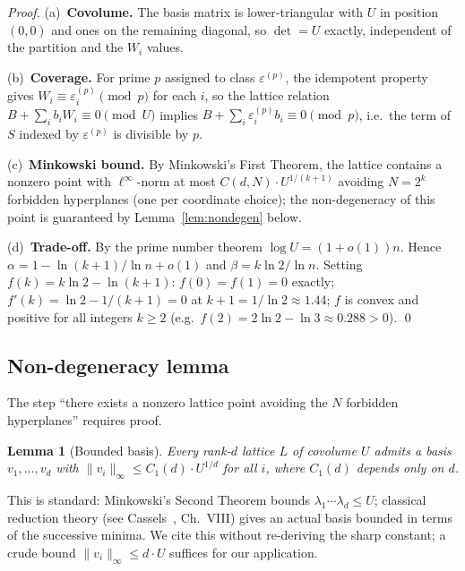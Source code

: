 \documentclass[12pt]{article}
\newtheorem{lemma}[theorem]{Lemma}
\theoremstyle{remark}
\newcommand{\norm}[1]{\lVert #1 \rVert}
\begin{document}
\begin{proof}
(a)~\textbf{Covolume.}  The basis matrix is lower-triangular with $U$ in
position $(0,0)$ and ones on the remaining diagonal, so $\det = U$ exactly,
independent of the partition and the $W_i$ values.

(b)~\textbf{Coverage.}  For prime $p$ assigned to class $\varepsilon^{(p)}$, the
idempotent property gives $W_i \equiv \varepsilon_i^{(p)} \pmod{p}$ for each
$i$, so the lattice relation $B + \sum_i b_i W_i \equiv 0 \pmod{U}$ implies $B
+ \sum_i \varepsilon_i^{(p)} b_i \equiv 0 \pmod{p}$, i.e.\ the term of $S$
indexed by $\varepsilon^{(p)}$ is divisible by $p$.

(c)~\textbf{Minkowski bound.}  By Minkowski's First Theorem, the lattice
contains a nonzero point with $\ell^\infty$-norm at most $C(d,N) \cdot
U^{1/(k+1)}$ avoiding $N = 2^k$ forbidden hyperplanes (one per coordinate
choice); the non-degeneracy of this point is guaranteed by
Lemma~\ref{lem:nondegen} below.

(d)~\textbf{Trade-off.}  By the prime number theorem $\log U = (1+o(1))n$.
Hence $\alpha = 1 - \ln(k+1)/\ln n + o(1)$ and $\beta = k \ln 2 / \ln n$.
Setting $f(k) = k \ln 2 - \ln(k+1)$: $f(0) = f(1) = 0$ exactly; $f'(k) = \ln 2
- 1/(k+1) = 0$ at $k+1 = 1/\ln 2 \approx 1.44$; $f$ is convex and positive for
all integers $k \ge 2$ (e.g.\ $f(2) = 2\ln 2 - \ln 3 \approx 0.288 > 0$). \qed
\end{proof}

\subsection{Non-degeneracy lemma}
\label{sec:nondegen}

The step ``there exists a nonzero lattice point avoiding the $N$ forbidden
hyperplanes'' requires proof.

\begin{lemma}[Bounded basis]
\label{lem:bounded-basis}
Every rank-$d$ lattice $L$ of covolume $U$ admits a basis $v_1,\ldots,v_d$
with $\norm{v_i}_\infty \le C_1(d) \cdot U^{1/d}$ for all $i$, where $C_1(d)$
depends only on $d$.
\end{lemma}

This is standard: Minkowski's Second Theorem bounds $\lambda_1 \cdots \lambda_d
\le U$; classical reduction theory (see Cassels~\cite{cassels1959}, Ch.~VIII)
gives an actual basis bounded in terms of the successive minima.  We cite this
without re-deriving the sharp constant; a crude bound $\norm{v_i}_\infty \le
d \cdot U$ suffices for our application.
\end{document}
